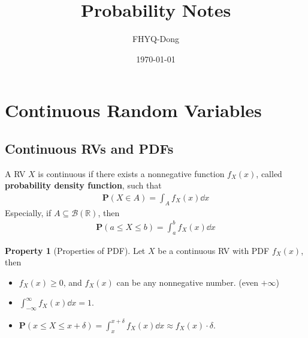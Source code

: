 \documentclass[device=normal, lang=en, fontsize=12pt]{elegantnote}
\title{Probability Notes}
\author{FHYQ-Dong}
\date{\today}
\numberwithin{equation}{section}
\theoremstyle{definition} %
\newtheorem{property}{Property}[section] %
\begin{document}
\maketitle
\newpage
\tableofcontents
\newpage









\section{Continuous Random Variables}
\subsection{Continuous RVs and PDFs}
\begin{definition}
    A RV $X$ is continuous if there exists a nonnegative function $f_{X}(x)$, called \textbf{probability density function}, such that
    \begin{align}
        \mathbf{P}(X \in A) = \int_{A} f_{X}(x) \dd{x}
    \end{align}
    Especially, if $A \subseteq \mathcal{B}(\mathbb{R})$, then
    \begin{align}
        \mathbf{P}(a \leq X \leq b) = \int_{a}^{b} f_{X}(x) \dd{x}
    \end{align}
\end{definition}
\begin{property}[Properties of PDF]
    Let $X$ be a continuous RV with PDF $f_{X}(x)$, then
    \begin{itemize}
        \item $f_{X}(x) \geq 0$, and $f_{X}(x)$ can be any nonnegative number. (even $+\infty$)
        \item $\int_{-\infty}^{\infty} f_{X}(x) \dd{x} = 1$.
        \item $\mathbf{P}(x \leq X \leq x + \delta) = \int_{x}^{x + \delta} f_{X}(x) \dd{x} \approx f_{X}(x) \cdot \delta$.
    \end{itemize}
\end{property}
\end{document}
